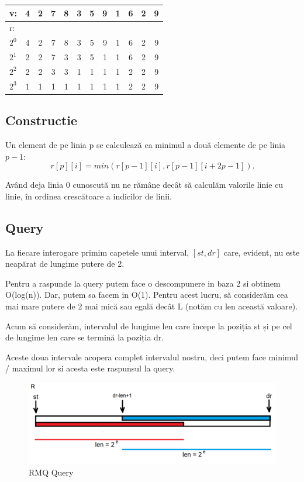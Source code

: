 \documentclass[11pt,a4paper]{article}
\theoremstyle{definition}
\theoremstyle{plain}
\theoremstyle{remark}
\begin{document}
\bigskip
\begin{tabular}{|l|c|c|c|c|c|c|c|c|c|c|c|}
\hline
v: & 4 & 2 & 7 & 8 & 3 & 5 & 9 & 1 & 6 & 2 & 9 \\
\hline
r: & & & & & & & & & & & \\
\hline
$2^0$ & 4 & 2 & 7 & 8 & 3 & 5 & 9 & 1 & 6 & 2 & 9 \\
\hline
$2^1$ & 2 & 2 & 7 & 3 & 3 & 5 & 1 & 1 & 6 & 2 & 9 \\
\hline
$2^2$ & 2 & 2 & 3 & 3 & 1 & 1 & 1 & 1 & 2 & 2 & 9 \\
\hline
$2^3$ & 1 & 1 & 1 & 1 & 1 & 1 & 1 & 1 & 2 & 2 & 9 \\
\hline
\end{tabular}
\bigskip

\subsection*{Constructie}
Un element de pe linia p se calculează ca minimul a două elemente de pe linia $p-1$:
$$r[p][i] = min (r[p-1][i], r[p-1][i+2
p-1]).$$

Având deja linia 0 cunoscută nu ne rămâne decât să calculăm valorile linie cu linie, în ordinea crescătoare a indicilor de linii.

\subsection*{Query}
La fiecare interogare primim capetele unui interval, $[st, dr]$ care, evident, nu este neapărat de lungime putere de 2.

Pentru a raspunde la query putem face o descompunere in baza 2 si obtinem O(log(n)). Dar, putem sa facem in O(1).
Pentru acest lucru, să considerăm cea mai mare putere de 2 mai mică sau egală decât L (notăm cu len această valoare). 

Acum să considerăm, intervalul de lungime len care începe la poziția st și pe cel de lungime len care se termină la poziția dr. 

Aceste doua intervale acopera complet intervalul nostru, deci putem face minimul / maximul lor si acesta este raspunsul la query.

\begin{figure}[H]
    \centering
    \includegraphics[width=0.75\linewidth]{rmq.png}
    \caption{RMQ Query}
    \label{fig:enter-label}
\end{figure}
\end{document}
